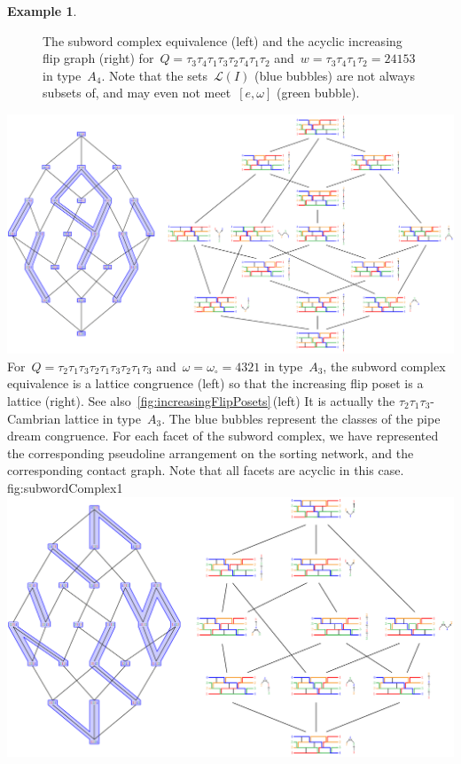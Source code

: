 \documentclass[reqno]{amsart}
\theoremstyle{definition}
\newtheorem{example}[theorem]{Example}
\newcommand{\linearExtensions}{\mathcal{L}} %
\newcommand{\wo}{\omega_\circ} %
\begin{document}
\begin{example}
\begin{figure}[p]
	\caption{The subword complex equivalence (left) and the acyclic increasing flip graph (right) for~$Q = \tau_3 \tau_4 \tau_1 \tau_3 \tau_2 \tau_4 \tau_1 \tau_2$ and~$w = \tau_3 \tau_4 \tau_1 \tau_2 = 24153$ in type~$A_4$. Note that the sets~$\linearExtensions(I)$ (blue bubbles) are not always subsets of, and may even not meet~$[e,\omega]$ (green bubble).}
	\label{fig:subwordComplex5}
\end{figure}
%
{\includegraphics[scale=.6]{subwordComplex1}}
{For~$Q = \tau_2 \tau_1 \tau_3 \tau_2 \tau_1 \tau_3 \tau_2 \tau_1 \tau_3$ and~$\omega = \wo = 4321$ in type~$A_3$, the subword complex equivalence is a lattice congruence (left) so that the increasing flip poset is a lattice (right). See also~\cref{fig:increasingFlipPosets}\,(left) It is actually the $\tau_2\tau_1\tau_3$-Cambrian lattice in type~$A_3$. The blue bubbles represent the classes of the pipe dream congruence. For each facet of the subword complex, we have represented the corresponding pseudoline arrangement on the sorting network, and the corresponding contact graph. Note that all facets are acyclic in this case.}
{fig:subwordComplex1}
%
{\includegraphics[scale=.7]{subwordComplex2}}

\end{example}
\end{document}
